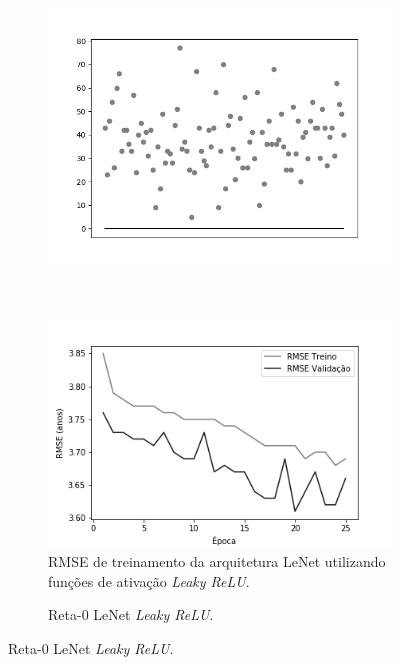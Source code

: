 \begin{figure}[hb!]
\begin{subfigure}[hb]{0.5\linewidth}
			\includegraphics[width=\linewidth]{img/graficos/reta0/lenet/fig-reta-0-image-treat-2-lenet-relu.png}%
		\end{subfigure}\\
		\begin{subfigure}[hb]{0.5\linewidth}
			\caption{RMSE de treinamento da arquitetura LeNet utilizando funções de ativação \emph{Leaky ReLU}.}
			\includegraphics[width=\linewidth]{img/graficos/history/lenet/fig-history-image-treat-2-lenet-lrelu-rmse.png}
		\end{subfigure}
		\begin{subfigure}[hb]{0.5\linewidth}
			\caption{Reta-0 LeNet \emph{Leaky ReLU}.}

\end{subfigure}
\end{figure}

